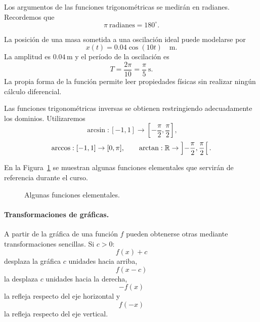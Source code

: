 Los argumentos de las funciones trigonométricas se medirán en radianes. Recordemos que
\[
\pi\ \text{radianes}=180^\circ.
\]

\begin{example}
La posición de una masa sometida a una oscilación ideal puede modelarse por
\[
x(t)=0.04\cos(10t)\quad \text{m}.
\]
La amplitud es $0.04\,\mathrm{m}$ y el período de la oscilación es
\[
T=\frac{2\pi}{10}=\frac{\pi}{5}\ \mathrm{s}.
\]
La propia forma de la función permite leer propiedades físicas sin realizar ningún cálculo diferencial.
\end{example}

Las funciones trigonométricas inversas se obtienen restringiendo adecuadamente los dominios. Utilizaremos
\[
\arcsin:[-1,1]\to\left[-\frac\pi2,\frac\pi2\right],
\]
\[
\arccos:[-1,1]\to[0,\pi],
\qquad
\arctan:\mathbb{R}\to\left]-\frac\pi2,\frac\pi2\right[.
\]

En la Figura~\ref{fig:elementales-t2} se muestran algunas funciones elementales que servirán de referencia durante el curso.

\begin{figure}[H]
\centering
{}
\caption{Algunas funciones elementales.}
\label{fig:elementales-t2}
\end{figure}

\paragraph{Transformaciones de gráficas.}
A partir de la gráfica de una función $f$ pueden obtenerse otras mediante transformaciones sencillas. Si $c>0$:
\[
f(x)+c
\]
desplaza la gráfica $c$ unidades hacia arriba,
\[
f(x-c)
\]
la desplaza $c$ unidades hacia la derecha,
\[
-f(x)
\]
la refleja respecto del eje horizontal y
\[
f(-x)
\]
la refleja respecto del eje vertical.

